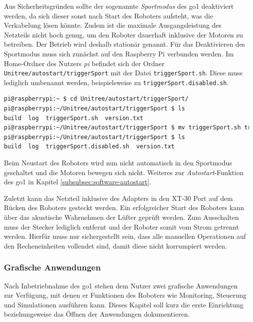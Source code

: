 Aus Sicherheitsgründen sollte der sogenannte \emph{Sportmodus} des \gls{go1} deaktiviert werden, da sich dieser sonst nach
Start des Roboters aufsteht, was die Verkabelung lösen könnte.
Zudem ist die maximale Ausgangsleistung des Netzteils nicht hoch genug, um den Roboter dauerhaft inklusive der Motoren
zu betreiben.
Der Betrieb wird deshalb stationär genannt.
Für das Deaktivieren des Sportmodus muss sich zunächst auf den Raspberry Pi verbunden werden.
Im Home-Ordner des Nutzers \emph{pi} befindet sich der Ordner \texttt{Unitree/autostart/triggerSport} mit der Datei
\texttt{trig\-ger\-Sport.sh}.
Diese muss lediglich umbenannt werden, beispielsweise zu \texttt{trig\-ger\-Sport.dis\-a\-bled.sh}.

\begin{lstlisting}[language=sh,label=lst:disable-triggersport]
pi@raspberrypi:~ $ cd Unitree/autostart/triggerSport/
pi@raspberrypi:~/Unitree/autostart/triggerSport $ ls
build  log  triggerSport.sh  version.txt
pi@raspberrypi:~/Unitree/autostart/triggerSport $ mv triggerSport.sh triggerSport.disabled.sh
pi@raspberrypi:~/Unitree/autostart/triggerSport $ ls
build  log  triggerSport.disabled.sh  version.txt
\end{lstlisting}

\noindent Beim Neustart des Roboters wird nun nicht automatisch in den Sportmodus geschaltet und die Motoren bewegen sich nicht.
Weiteres zur \emph{Autostart}-Funktion des \gls{go1} in Kapitel \ref{subsubsec:software-autostart}.

Zuletzt kann das Netzteil inklusive des Adapters in den XT-30 Port auf dem Rücken des Roboters gesteckt werden.
Ein erfolgreicher Start des Roboters kann über das akustische Wahrnehmen der Lüfter geprüft werden.
Zum Ausschalten muss der Stecker lediglich entfernt und der Roboter somit vom Strom getrennt werden.
Hierfür muss nur sichergestellt sein, dass alle manuellen Operationen auf den Recheneinheiten vollendet sind, damit diese
nicht korrumpiert werden.

\subsubsection{Grafische Anwendungen}
\label{subsubsec:anwendungen}

Nach Inbetriebnahme des \gls{go1} stehen dem Nutzer zwei grafische Anwendungen zur Verfügung, mit denen er Funktionen
des Roboters wie Monitoring, Steuerung und Simulationen ausführen kann.
Dieses Kapitel soll kurz die erste Einrichtung beziehungsweise das Öffnen der Anwendungen dokumentieren.

